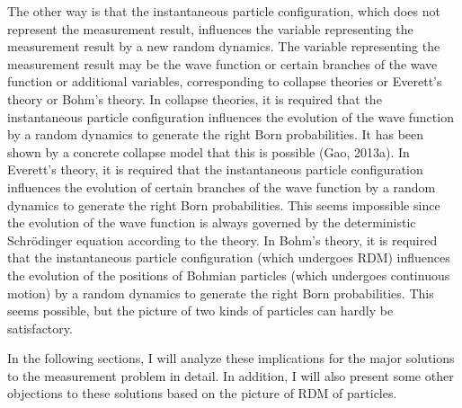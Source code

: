 The other way is that the instantaneous particle configuration, which does not represent the measurement result, influences the variable representing the measurement result by a new random dynamics.
The variable representing the measurement result may be the wave function or certain branches of the wave function or additional variables, corresponding to collapse theories or Everett's theory or Bohm's theory.
In collapse theories, it is required that the instantaneous particle configuration influences the evolution of the wave function by a random dynamics to generate the right Born probabilities. It has been shown by a concrete collapse model that this is possible (Gao, 2013a). 
In Everett's theory, it is required that the instantaneous particle configuration influences the evolution of certain branches of the wave function by a random dynamics to generate the right Born probabilities.
This seems impossible since  the evolution of  the wave function is always governed by the deterministic Schr\"{o}dinger equation according to the theory.
In Bohm's theory, it is required that the instantaneous particle configuration (which undergoes RDM) influences the evolution of the positions of Bohmian particles (which undergoes continuous motion) by a random dynamics to generate the right Born probabilities.
This seems possible, but the picture of two kinds of particles can hardly be satisfactory.

In the following sections, I will analyze these implications for the major solutions to the measurement problem in detail. In addition, I will also present some other objections to these solutions based on the picture of RDM of particles.



